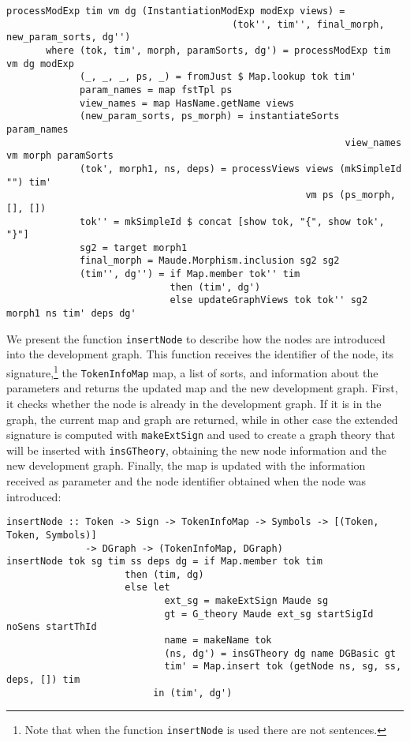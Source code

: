 \begin{itemize}
{\codesize
\begin{verbatim}
processModExp tim vm dg (InstantiationModExp modExp views) = 
                                        (tok'', tim'', final_morph, new_param_sorts, dg'')
       where (tok, tim', morph, paramSorts, dg') = processModExp tim vm dg modExp
             (_, _, _, ps, _) = fromJust $ Map.lookup tok tim'
             param_names = map fstTpl ps
             view_names = map HasName.getName views
             (new_param_sorts, ps_morph) = instantiateSorts param_names 
                                                            view_names vm morph paramSorts
             (tok', morph1, ns, deps) = processViews views (mkSimpleId "") tim' 
                                                     vm ps (ps_morph, [], [])
             tok'' = mkSimpleId $ concat [show tok, "{", show tok', "}"]
             sg2 = target morph1
             final_morph = Maude.Morphism.inclusion sg2 sg2
             (tim'', dg'') = if Map.member tok'' tim
                             then (tim', dg')
                             else updateGraphViews tok tok'' sg2 morph1 ns tim' deps dg'
\end{verbatim}
}

\end{itemize}

We present the function \verb"insertNode" to describe how the nodes are
introduced into the development graph. This function receives the
identifier of the node, its signature,\footnote{Note that when the
function \texttt{insertNode} is used there are not sentences.}
the \verb"TokenInfoMap" map, a list of sorts, and information
about the parameters and returns the updated map and the new development
graph. First, it checks whether
the node is already in the development graph. If it is in the graph,
the current map and graph are returned, while in other case the extended
signature is computed with \verb"makeExtSign" and used to create a graph
theory that will be inserted with \verb"insGTheory", obtaining the new
node information and the new development graph. Finally, the map is
updated with the information received as parameter and the node identifier
obtained when the node was introduced:

{\codesize
\begin{verbatim}
insertNode :: Token -> Sign -> TokenInfoMap -> Symbols -> [(Token, Token, Symbols)]
              -> DGraph -> (TokenInfoMap, DGraph)
insertNode tok sg tim ss deps dg = if Map.member tok tim
                     then (tim, dg)
                     else let
                            ext_sg = makeExtSign Maude sg
                            gt = G_theory Maude ext_sg startSigId noSens startThId
                            name = makeName tok
                            (ns, dg') = insGTheory dg name DGBasic gt
                            tim' = Map.insert tok (getNode ns, sg, ss, deps, []) tim
                          in (tim', dg')
\end{verbatim}
}

